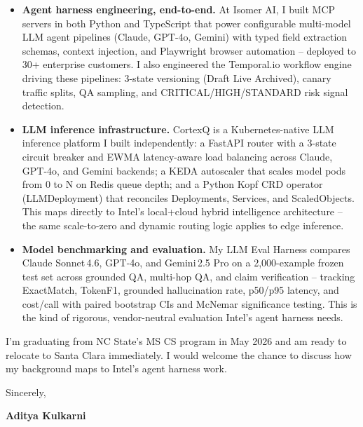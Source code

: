 \documentclass[11pt]{article}
\begin{document}
\begin{itemize}[leftmargin=*, label={\textcolor{accent}{\faAngleRight}}, itemsep=4pt]
  \item \textbf{Agent harness engineering, end-to-end.} At Isomer AI, I built MCP servers in both Python and TypeScript that power configurable multi-model LLM agent pipelines (Claude, GPT-4o, Gemini) with typed field extraction schemas, context injection, and Playwright browser automation -- deployed to 30+ enterprise customers. I also engineered the Temporal.io workflow engine driving these pipelines: 3-state versioning (Draft\,\textrightarrow\,Live\,\textrightarrow\,Archived), canary traffic splits, QA sampling, and CRITICAL/HIGH/STANDARD risk signal detection.

  \item \textbf{LLM inference infrastructure.} CortexQ is a Kubernetes-native LLM inference platform I built independently: a FastAPI router with a 3-state circuit breaker and EWMA latency-aware load balancing across Claude, GPT-4o, and Gemini backends; a KEDA autoscaler that scales model pods from 0 to N on Redis queue depth; and a Python Kopf CRD operator (LLMDeployment) that reconciles Deployments, Services, and ScaledObjects. This maps directly to Intel's local+cloud hybrid intelligence architecture -- the same scale-to-zero and dynamic routing logic applies to edge inference.

  \item \textbf{Model benchmarking and evaluation.} My LLM Eval Harness compares Claude Sonnet\,4.6, GPT-4o, and Gemini\,2.5 Pro on a 2,000-example frozen test set across grounded QA, multi-hop QA, and claim verification -- tracking ExactMatch, TokenF1, grounded hallucination rate, p50/p95 latency, and cost/call with paired bootstrap CIs and McNemar significance testing. This is the kind of rigorous, vendor-neutral evaluation Intel's agent harness needs.
\end{itemize}

\vspace{8pt}
I'm graduating from NC State's MS CS program in May 2026 and am ready to relocate to Santa Clara immediately. I would welcome the chance to discuss how my background maps to Intel's agent harness work.

\vspace{10pt}
Sincerely,

\vspace{4pt}
\textbf{Aditya Kulkarni}
\end{document}
